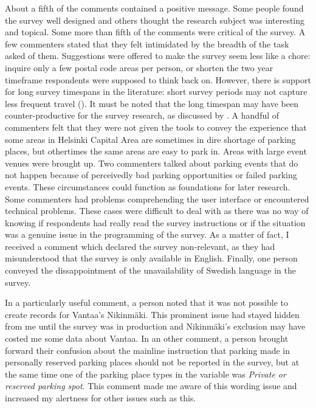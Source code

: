 About a fifth of the comments contained a positive message. Some people found the survey well designed and others thought the research subject was interesting and topical. Some more than fifth of the comments were critical of the survey. A few commenters stated that they felt intimidated by the breadth of the task asked of them. Suggestions were offered to make the survey seem less like a chore: inquire only a few postal code areas per person, or shorten the two year timeframe respondents were supposed to think back on. However, there is support for long survey timespans in the literature: short survey periods may not capture less frequent travel (\cite{Mokhtarian2004}). It must be noted that the long timespan may have been counter-productive for the survey research, as discussed by . A handful of commenters felt that they were not given the tools to convey the experience that some areas in Helsinki Capital Area are sometimes in dire shortage of parking places, but othertimes the same areas are easy to park in. Areas with large event venues were brought up. Two commenters talked about parking events that do not happen because of perceivedly bad parking opportunities or failed parking events. These circumstances could function as foundations for later research. Some commenters had problems comprehending the user interface or encountered technical problems. These cases were difficult to deal with as there was no way of knowing if respondents had really read the survey instructions or if the situation was a genuine issue in the programming of the survey. As a matter of fact, I received a comment which declared the survey non-relevant, as they had misunderstood that the survey is only available in English. Finally, one person conveyed the dissappointment of the unavailability of Swedish language in the survey.

In a particularly useful comment, a person noted that it was not possible to create records for Vantaa's Nikinmäki. This prominent issue had stayed hidden from me until the survey was in production and Nikinmäki's exclusion may have costed me some data about Vantaa. In an other comment, a person brought forward their confusion about the mainline instruction that parking made in personally reserved parking places should not be reported in the survey, but at the same time one of the parking place types in the variable  was \textit{Private or reserved parking spot}. This comment made me aware of this wording issue and increased my alertness for other issues such as this.

